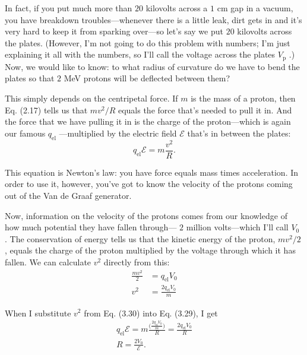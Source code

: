 \documentclass[11pt,oneside]{article}
\providecommand{\emf}{\mathcal{E}}
\begin{document}
In fact, if you put much more than \(20\) kilovolts across a \(1\) cm gap in a vacuum, you have breakdown troubles---whenever there is a little leak, dirt gets in and it's very hard to keep it from sparking over---so let's say we put \(20\) kilovolts across the plates. (However, I'm not going to do this problem with numbers; I'm just explaining it all with the numbers, so I'll call the voltage across the plates \(V_\text{p}\) .) Now, we would like to know: to what radius of curvature do we have to bend the plates so that \(2\) MeV protons will be deflected between them?\par

This simply depends on the centripetal force. If \(m\) is the mass of a proton, then Eq. (2.17) tells us that \(mv^2/R\) equals the force that's needed to pull it in. And the force that we have pulling it in is the charge of the proton---which is again our famous \(q_\text{el}\) ---multiplied by the electric field \(\emf\) that's in between the plates: 
\begin{equation*} \tag{3.29}
\label{Eq:TIPS:3:29} q_\text{el}\emf = m\frac{v^2}{R}. \end{equation*}
\par

This equation is Newton's law: you have force equals mass times acceleration. In order to use it, however, you've got to know the velocity of the protons coming out of the Van de Graaf generator.\par

Now, information on the velocity of the protons comes from our knowledge of how much potential they have fallen through--- \(2\) million volts---which I'll call \(V_0\) . The conservation of energy tells us that the kinetic energy of the proton, \(mv^2/2\) , equals the charge of the proton multiplied by the voltage through which it has fallen. We can calculate \(v^2\) directly from this: 
\begin{equation*} \begin{aligned} \frac{mv^2}{2} &= q_\text{el}V_0\\[1ex] v^2 &= \frac{2q_\text{el}V_0}{m} \end{aligned} \tag{3.30}
\label{Eq:TIPS:3:30} \end{equation*}
\par

When I substitute \(v^2\) from Eq. (3.30) into Eq. (3.29), I get 
\begin{equation*} \begin{gathered} q_\text{el}\emf = m\frac{\displaystyle \bigg(\frac{2q_\text{el}V_0}{m}\bigg)}{R} = \frac{2q_\text{el}V_0}{R}\\[1em] R = \frac{2V_0}{\emf}. \end{gathered} \tag{3.31}
\label{Eq:TIPS:3:31} \end{equation*}
\par
\end{document}
